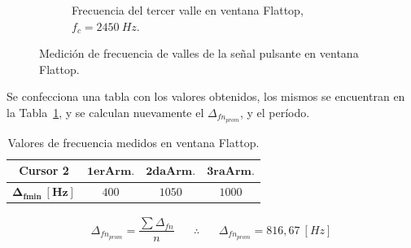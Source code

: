 \begin{figure}[H]
        \hfill
        \begin{subfigure}[H]{0.48\textwidth}
          \caption{Frecuencia del tercer valle en ventana Flattop, $f_{c}=2450~Hz$.}
        \end{subfigure}

        \caption{Medición de frecuencia de valles de la señal pulsante en ventana Flattop.}
        \label{fig:Exp2SeñalPulsanteVallesEspectro}
      \end{figure}     

      Se confecciona una tabla con los valores obtenidos, los mismos se encuentran en la 
      Tabla~\ref{tab:Exp2MedicionesFlattop}, y se calculan nuevamente el $\Delta_{fn_{prom}}$, 
      y el período. 

      \begin{table}[H]
      \centering
        \begin{tabular}{cccc} \hline \hline
          \textbf{Cursor 2}               &  $\mathbf{1erArm.}$       & $\mathbf{2daArm.}$        & $\mathbf{3raArm.}$   \\ \hline
          $\mathbf{\Delta_{fmin}~[Hz]}$       &   $400$                        &    $1050$                    &   $1000$                     \\
         \end{tabular}
          \caption{Valores de frecuencia medidos en ventana Flattop.}
          \label{tab:Exp2MedicionesFlattop}
      \end{table}  

      \begin{align*}
        \Delta_{fn_{prom}}=\dfrac{\sum{\Delta_{fn}}}{n} \hspace{20pt} \therefore \hspace{20pt} \boxed{\Delta_{fn_{prom}}=816,67~[Hz]}
      \end{align*}        

